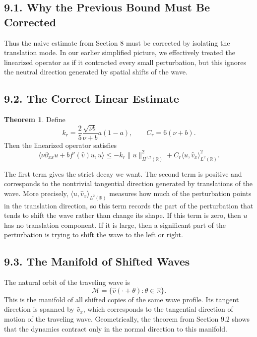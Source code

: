 \documentclass[11pt]{article}
\theoremstyle{definition}
\newtheorem{theorem}{Theorem}
\theoremstyle{remark}
\begin{document}
\subsection*{9.1. Why the Previous Bound Must Be Corrected}
Thus the naive estimate from Section 8 must be corrected by isolating the translation mode. In our earlier simplified picture, we effectively treated the linearized operator as if it contracted every small perturbation, but this ignores the neutral direction generated by spatial shifts of the wave.

\subsection*{9.2. The Correct Linear Estimate}
\begin{theorem}
Define
\[
k_r=\frac{2}{5}\frac{\sqrt{\nu b}}{\nu+b}a(1-a),
\qquad
C_r=6(\nu+b).
\]
Then the linearized operator satisfies
\[
\langle \nu \partial_{xx}u+b f'(\hat v)u,u\rangle
\leq
-k_r\|u\|_{H^{1,2}(\mathbb R)}^2
+C_r\langle u,\hat v_x\rangle_{L^2(\mathbb R)}^2.
\]
\end{theorem}
The first term gives the strict decay we want. The second term is positive and corresponds to the nontrivial tangential direction generated by translations of the wave. More precisely, $\langle u,\hat v_x\rangle_{L^2(\mathbb R)}$ measures how much of the perturbation points in the translation direction, so this term records the part of the perturbation that tends to shift the wave rather than change its shape. If this term is zero, then $u$ has no translation component. If it is large, then a significant part of the perturbation is trying to shift the wave to the left or right.

\subsection*{9.3. The Manifold of Shifted Waves}
The natural orbit of the traveling wave is
\[
\mathcal M=\{\hat v(\cdot+\theta):\theta\in\mathbb R\}.
\]
This is the manifold of all shifted copies of the same wave profile. Its tangent direction is spanned by $\hat v_x$, which corresponds to the tangential direction of motion of the traveling wave. Geometrically, the theorem from Section 9.2 shows that the dynamics contract only in the normal direction to this manifold.
\end{document}
